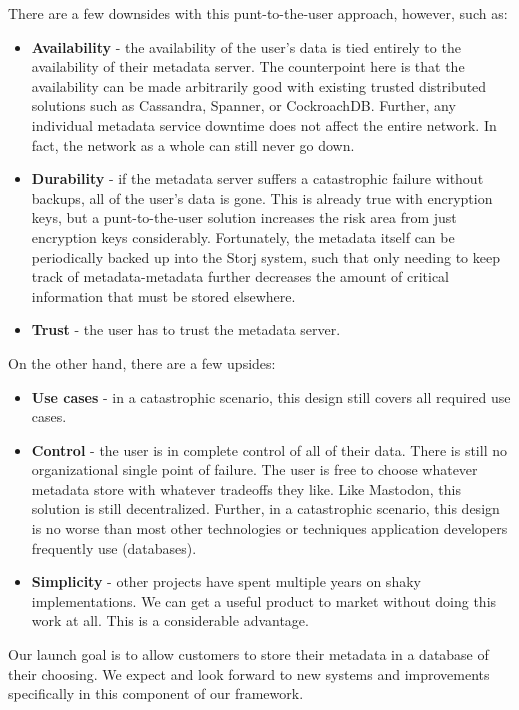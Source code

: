 \documentclass[a4paper,10pt]{article} \usepackage[utf8]{inputenc}
\begin{document}
There are a few downsides with this punt-to-the-user approach, however, such as:
\begin{itemize}
\item {\bf Availability} - the availability of the user's data
is tied entirely to the availability of their metadata server. The counterpoint
here is that the availability can be made arbitrarily good with existing trusted
distributed solutions such as Cassandra, Spanner, or CockroachDB. Further, any
individual metadata service downtime does not affect the entire network. In
fact, the network as a whole can still never go down.
\item {\bf Durability} -
if the metadata server suffers a catastrophic failure without backups, all of
the user's data is gone. This is already true with encryption keys, but a
punt-to-the-user solution increases the risk area from just encryption keys
considerably. Fortunately, the metadata itself can be periodically backed up
into the Storj system, such that only needing to keep track of metadata-metadata
further decreases the amount of critical information that must be stored
elsewhere.
\item {\bf Trust} - the user has to trust the metadata server.
\end{itemize}

On the other hand, there are a few upsides: \begin{itemize} \item {\bf Use
cases} - in a catastrophic scenario, this design still covers all required use
cases. \item {\bf Control} - the user is in complete control of all of their
data. There is still no organizational single point of failure. The user is free
to choose whatever metadata store with whatever tradeoffs they like. Like
Mastodon\cite{mastodon}, this solution is still decentralized. Further, in a
catastrophic scenario, this design is no worse than most other technologies or
techniques application developers frequently use (databases). \item {\bf
Simplicity} - other projects have spent multiple years on shaky implementations.
We can get a useful product to market without doing this work at all. This is a
considerable advantage. \end{itemize}

Our launch goal is to allow customers to store their metadata in a database of
their choosing. We expect and look forward to new systems and improvements
specifically in this component of our framework.
\end{document}
